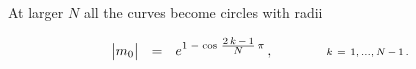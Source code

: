 \documentclass[12pt,letterpaper,landscape,KOMA,smallheadings,calcdimensions,display]{powersem}
\begin{document}
\begin{slide}

\centerline{At larger $ N $ all the curves become circles with radii}
\vspace{-0.5cm}
\[
	\big| m_0 \big| ~~=~~ e^{ 1 \;-\; \cos\, \frac{\scriptstyle 2\, k \,-\, 1 } {\scriptstyle N }\, {\scriptstyle \pi} }\,,
	\qquad\qquad 
	\scriptstyle k ~=~ 1,\, ...,\, N\,-\,1\,\text.
\]


\end{slide}
\end{document}
